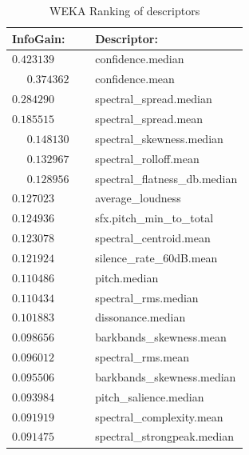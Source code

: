 \documentclass{proc}
\begin{document}
\begin{table}[h]
    \begin{center}
        \begin{tabular}{ | l | l |}
            \hline
            InfoGain:   &   Descriptor: \\  \hline
            \hline
            $0.423139$  &    confidence.median \\ \hline
            $0.374362$  &    confidence.mean \\ \hline
            $0.284290$  &    spectral\_spread.median    \\  \hline
            $0.185515$  &    spectral\_spread.mean    \\  \hline
            $0.148130$  &    spectral\_skewness.median    \\  \hline
            $0.132967$  &    spectral\_rolloff.mean    \\  \hline
            $0.128956$  &    spectral\_flatness\_db.median    \\  \hline
            $0.127023$  &    average\_loudness    \\  \hline
            $0.124936$  &   sfx.pitch\_min\_to\_total    \\  \hline
            $0.123078$  &    spectral\_centroid.mean    \\  \hline
            $0.121924$  &    silence\_rate\_60dB.mean    \\  \hline
            $0.110486$  &    pitch.median    \\  \hline
            $0.110434$  &    spectral\_rms.median    \\  \hline
            $0.101883$  &    dissonance.median    \\  \hline
            $0.098656$  &    barkbands\_skewness.mean    \\  \hline
            $0.096012$  &    spectral\_rms.mean    \\  \hline
            $0.095506$  &    barkbands\_skewness.median    \\  \hline
            $0.093984$  &    pitch\_salience.median    \\  \hline
            $0.091919$  &    spectral\_complexity.mean    \\  \hline
            $0.091475$  &    spectral\_strongpeak.median    \\  \hline
        \end{tabular}
        \caption{WEKA Ranking of descriptors}
        \label{table:weka_desc}
    \end{center}
\end{table}
\end{document}
